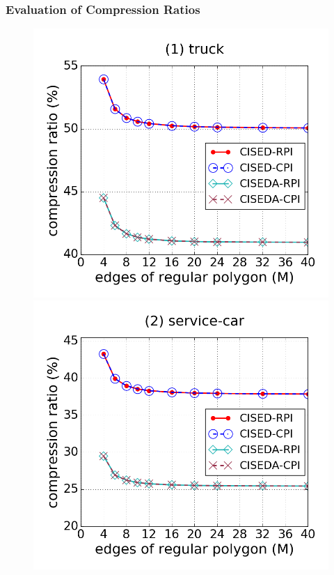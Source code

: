 \subsubsection{Evaluation of Compression Ratios}



\begin{figure}[tb!]
\centering
\includegraphics[scale = 0.250]{figures/Exp-M-e-10-CR-truck.png}
\includegraphics[scale = 0.250]{figures/Exp-M-e-10-CR-service.png}

\end{figure}
